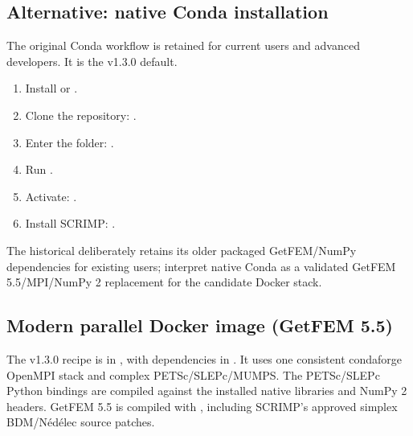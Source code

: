 \documentclass[letterpaper,10pt,english]{sphinxmanual}
\begin{document}
\subsection{Alternative: native Conda installation}
\label{\detokenize{install:alternative-native-conda-installation}}
\sphinxAtStartPar
The original Conda workflow is retained for current users and
advanced developers. It is  the v1.3.0 default.
\begin{enumerate}
%
\item {} 
\sphinxAtStartPar
Install  or
.

\item {} 
\sphinxAtStartPar
Clone the repository: .

\item {} 
\sphinxAtStartPar
Enter the folder: .

\item {} 
\sphinxAtStartPar
Run .

\item {} 
\sphinxAtStartPar
Activate: .

\item {} 
\sphinxAtStartPar
Install SCRIMP: .

\end{enumerate}

\sphinxAtStartPar
The historical  deliberately retains its older
packaged GetFEM/NumPy dependencies for existing users; 
interpret native Conda as a validated GetFEM 5.5/MPI/NumPy 2
replacement for the candidate Docker stack.


\subsection{Modern parallel Docker image (GetFEM 5.5)}
\label{\detokenize{install:modern-parallel-docker-image-getfem-5-5}}
\sphinxAtStartPar
The v1.3.0  recipe is in ,
with dependencies in . It uses one
consistent conda\sphinxhyphen{}forge OpenMPI stack and complex PETSc/SLEPc/MUMPS.
The PETSc/SLEPc Python bindings are compiled against the installed
native libraries and NumPy 2 headers. GetFEM 5.5 is compiled with
, including SCRIMP’s approved simplex
BDM/Nédélec source patches.
\end{document}
